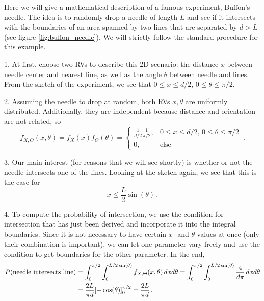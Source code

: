 \begin{ex}
Here we will give a mathematical description of a famous experiment, Buffon's needle. The idea is to randomly drop a needle of length $L$ and see if it intersects with the boundaries of an area spanned by two lines that are separated by $d > L$ (see figure \ref{fig:buffon_needle}). We will strictly follow the standard procedure for this example.

1. At first, choose two RVs to describe this 2D scenario: the distance $x$ between needle center and nearest line, as well as the angle $\theta$ between needle and lines. From the sketch of the experiment, we see that $0 \leq x \leq d / 2, \, 0 \leq \theta \leq \pi / 2$.

2. Assuming the needle to drop at random, both RVs $x, \theta$ are uniformly distributed. Additionally, they are independent because distance and orientation are not related, so
\begin{equation*}
f_{X, \Theta}(x, \theta) = f_X(x) f_\Theta(\theta) = \begin{cases} \frac{1}{d / 2} \frac{1}{\pi / 2}, & 0 \leq x \leq d / 2, \, 0 \leq \theta \leq \pi / 2 \\ 0, & \text{else} \end{cases} \, .
\end{equation*}

3. Our main interest (for reasons that we will see shortly) is whether or not the needle intersects one of the lines. Looking at the sketch again, we see that this is the case for
\begin{equation*}
x \leq \frac{L}{2} \sin(\theta) \, .
\end{equation*}

4. To compute the probability of intersection, we use the condition for intersection that has just been derived and incorporate it into the integral boundaries. Since it is not necessary to have certain $x$- and $\theta$-values at once (only their combination is important), we can let one parameter vary freely and use the condition to get boundaries for the other parameter. In the end,
\begin{align*}
P(\text{needle intersects line}) &= \int_0^{\pi / 2} \int_0^{L / 2 \sin(\theta)} f_{X, \Theta}(x, \theta) \, dx d\theta = \int_0^{\pi / 2} \int_0^{L / 2 \sin(\theta)} \frac{4}{d \pi} \, dx d\theta
\\
&= \frac{2 L}{\pi d} \qty[-\cos(\theta)]_0^{\pi / 2} = \frac{2 L}{\pi d} \, .
\end{align*}


\end{ex}
